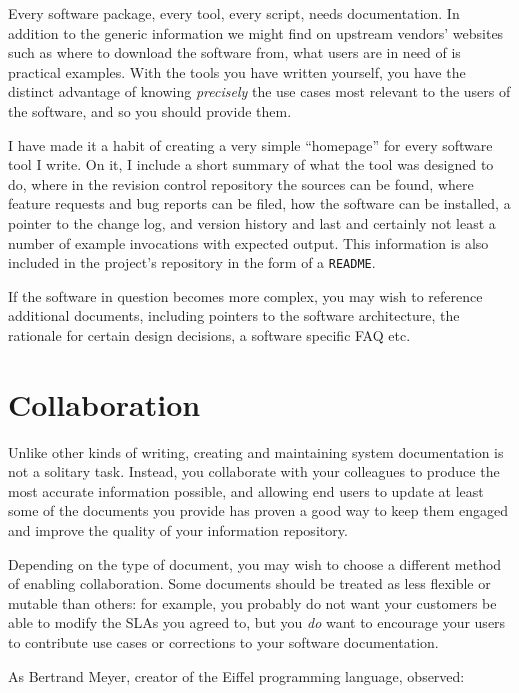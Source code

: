 Every software package, every tool, every script,
needs documentation.  In addition to the generic
information we might find on upstream vendors'
websites such as where to download the software from,
what users are in need of is practical examples.  With
the tools you have written yourself, you have the
distinct advantage of knowing {\em precisely} the use
cases most relevant to the users of the software, and
so you should provide them.

I have made it a habit of creating a very simple
``homepage'' for every software tool I write.  On it,
I include a short summary of what the tool was
designed to do, where in the revision
control repository the sources
can be found, where feature requests and bug reports
can be filed, how the software can be installed, a
pointer to the change log, and version history and
last and certainly not least a number of example
invocations with expected output.  This information is
also included in the project's repository in the form
of a {\tt README}.

If the software in question becomes more complex, you
may wish to reference additional documents, including
pointers to the software architecture, the rationale
for certain design decisions, a software specific FAQ
etc.

\section{Collaboration}
\label{documentation:collaboration}

Unlike other kinds of writing, creating and
maintaining system documentation is not a solitary
task.  Instead, you collaborate with your colleagues
to produce the most accurate information possible, and
allowing end users to update at least some of the
documents you provide has proven a good way to keep
them engaged and improve the quality of your
information repository.

Depending on the type of document, you may wish to
choose a different method of enabling collaboration.
Some documents should be treated as less flexible or
mutable than others: for example, you probably do not
want your customers be able to modify the SLAs you
agreed to, but you {\em do} want to encourage your
users to contribute use cases or corrections to your
software documentation.

As Bertrand Meyer,
creator of the Eiffel programming language,
observed:


